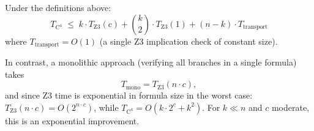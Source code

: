 \begin{theorem}
\label{thm:decomp-transport}
Under the definitions above:
\[
  T_{\mathrm{C}^4}
  \;\leq\;
  k \cdot T_{\mathrm{Z3}}(c)
  + \binom{k}{2} \cdot T_{\mathrm{Z3}}(1)
  + (n - k) \cdot T_{\mathrm{transport}}
\]
where $T_{\mathrm{transport}} = O(1)$ (a single Z3 implication check
of constant size).

In contrast, a monolithic approach (verifying all branches in a single
formula) takes
\[
  T_{\mathrm{mono}} = T_{\mathrm{Z3}}(n \cdot c),
\]
and since Z3 time is exponential in formula size in the worst case:
$T_{\mathrm{Z3}}(n \cdot c) = O(2^{n \cdot c})$,
while $T_{\mathrm{C}^4} = O(k \cdot 2^c + k^2)$.
For $k \ll n$ and $c$ moderate, this is an exponential improvement.
\end{theorem}

